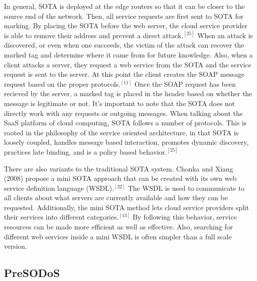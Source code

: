 \documentclass[a4paper, 8pt]{article} %
\begin{document}
\begin{doublespacing}
In general, SOTA is deployed at the edge routers so that it can be closer to the source end of the network.  Then, all service requests are first sent to SOTA for marking.  By placing the SOTA before the web server, the cloud service provider is able to remove their address and prevent a direct attack.$^{[25]}$  When an attack is discovered, or even when one succeeds, the victim of the attack can recover the marked tag and determine where it came from for future knowledge.  Also, when a client attacks a server, they request a web service from the SOTA and the service request is sent to the server.  At this point the client creates the SOAP message request based on the proper protocols.$^{[11]}$  Once the SOAP request has been recieved by the server, a marked tag is placed in the header based on whether the message is legitimate or not.  It's important to note that the SOTA does not directly work with any requests or outgoing messages.  When talking about the SaaS platform of cloud computing, SOTA follows a number of protocols.  This is rooted in the philosophy of the service oriented architecture, in that SOTA is loosely coupled, handles message based interaction, promotes dynamic discovery, practices late binding, and is a policy based behavior.$^{[25]}$  

There are also variants to the traditional SOTA system.  Chonka and Xiang (2008) propose a mini SOTA approach that can be created with its own web service definition language (WSDL).$^{[22]}$  The WSDL is used to communicate to all clients about what servers are currently available and how they can be requested.  Additionally, the mini SOTA method lets cloud service providers split their services into different categories.$^{[13]}$  By following this behavior, service resources can be made more efficient as well as effective.  Also, searching for different web services inside a mini WSDL is often simpler than a full scale version.  

\subsection*{PreSODoS}


\end{doublespacing}
\end{document}
